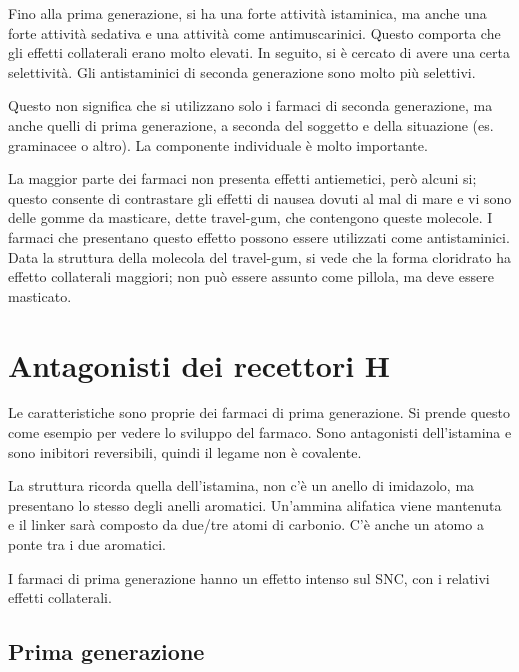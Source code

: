 Fino alla prima generazione, si ha una forte attività istaminica, ma
anche una forte attività sedativa e una attività come antimuscarinici.
Questo comporta che gli effetti collaterali erano molto elevati.
In seguito, si è cercato di avere una certa selettività. Gli
antistaminici di seconda generazione sono molto più selettivi.

Questo non significa che si utilizzano solo i farmaci di seconda
generazione, ma anche quelli di prima generazione, a seconda del
soggetto e della situazione (es. graminacee o altro). La componente
individuale è molto importante.

La maggior parte dei farmaci non presenta effetti antiemetici, però
alcuni si; questo consente di contrastare gli effetti di nausea dovuti al mal di
mare e vi sono delle gomme da masticare, dette travel-gum, che contengono queste molecole.
I farmaci che presentano questo effetto possono essere utilizzati come antistaminici.
Data la struttura della molecola del travel-gum, si vede che la forma
cloridrato ha effetto collaterali maggiori; non può essere assunto come
pillola, ma deve essere masticato.


\section{\texorpdfstring{Antagonisti dei recettori H}{Antagonisti dei recettori H1}}

Le caratteristiche sono proprie dei farmaci di prima generazione. Si
prende questo come esempio per vedere lo sviluppo del farmaco.
Sono antagonisti dell'istamina e sono inibitori reversibili, quindi il legame non è covalente.

La struttura ricorda quella dell'istamina, non c'è un anello di
imidazolo, ma presentano lo stesso degli anelli aromatici. Un'ammina
alifatica viene mantenuta e il linker sarà composto da due/tre atomi di
carbonio.
C'è anche un atomo a ponte tra i due aromatici.

I farmaci di prima generazione hanno un effetto intenso sul SNC, con i
relativi effetti collaterali.

\subsection{Prima generazione}

